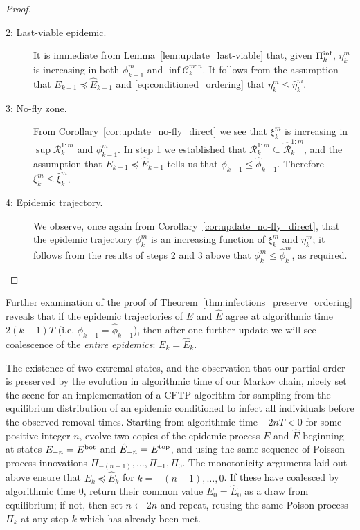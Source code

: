 \documentclass[]{article}
\newcommand{\Conditioned}{\mathcal{C}}
\newcommand{\Epidemic}{E}%
\newcommand{\Removals}{\mathcal{R}}
\newcommand{\ple}{\preceq}
\newcommand{\Poisson}{\Pi}
\newcommand{\early}[1]{#1}
\newcommand{\late}[1]{\hat{#1}}
\newcommand{\PoissonInf}{\Poisson^\textup{inf}}
\newcommand{\Bot}[1][]{{}^{\textup{bot}#1}}
\newcommand{\Top}[1][]{{}^{\textup{top}#1}}
\begin{document}
\begin{proof}
\begin{description}
	\item[2: Last-viable epidemic.] It is immediate from Lemma~\ref{lem:update_last-viable} that, given \(\PoissonInf_k\), \(\eta^m_k\) is increasing in both \(\phi^m_{k-1}\) and \(\inf\Conditioned^{m:n}_k\). It follows from the assumption that \(\early{E}_{k-1} \ple \late{E}_{k-1}\) and 	 \eqref{eq:conditioned_ordering} that \(\early{\eta}^m_k\le \late{\eta}^m_k\).
	
	\item[3: No-fly zone.] From Corollary~\ref{cor:update_no-fly_direct} we see that \(\xi^m_k\) is increasing in \(\sup \Removals^{1:m}_k\) and \(\phi^m_{k-1}\). In step 1 we established that \(\early{\Removals}^{1:m}_k\subseteq \late{\Removals}^{1:m}_k\), and the assumption that \(\early{E}_{k-1} \ple \late{E}_{k-1}\) tells us that \(\early{\phi}_{k-1} \le \late{\phi}_{k-1}\). Therefore \(\early{\xi}^m_k\le \late{\xi}^m_k\).
	
	\item[4: Epidemic trajectory.] We observe, once again from Corollary~\ref{cor:update_no-fly_direct}, that the epidemic trajectory \(\phi^m_k\) is an increasing function of \(\xi^m_k\) and \(\eta^m_k\); it follows from the results of steps 2 and 3 above that \(\early{\phi}^m_k\le \late{\phi}^m_k\), as required.
\end{description}
\end{proof}

\begin{rem}
	Further examination of the proof of Theorem~\ref{thm:infections_preserve_ordering} reveals that if the epidemic trajectories of \(\early{\Epidemic}\) and \(\late{\Epidemic}\) agree at algorithmic time \(2(k{-}1)T\) (i.e. \(\early{\phi}_{k-1} = \late{\phi}_{k-1}\)), then after one further update we will see coalescence of the \emph{entire epidemics}: \(\early{\Epidemic}_k = \late{\Epidemic}_k\). 
\end{rem}

The existence of two extremal states, and the observation that our partial order is preserved by the evolution in algorithmic time of our Markov chain, nicely set the scene for an implementation of a CFTP algorithm for sampling from the equilibrium distribution of an epidemic conditioned to infect all individuals before the observed removal times. Starting from algorithmic time \(-2nT<0\)
for some positive integer \(n\), evolve two copies of the epidemic process \(\early\Epidemic\) and \(\late\Epidemic\) beginning at states \(\early\Epidemic_{-n} = \Epidemic\Bot\) and \(\late\Epidemic_{-n} = \Epidemic\Top\), and using the same sequence of Poisson process innovations \(\Poisson_{-(n-1)},\dots,\Poisson_{-1},\Poisson_0\). The monotonicity arguments laid out above ensure that \(\early\Epidemic_k \ple \late\Epidemic_k\) for \(k=-(n-1),\dots,0\). If these have coalesced by algorithmic time 0, return their common value \(\early\Epidemic_0 = \late\Epidemic_0\) as a draw from equilibrium; if not, then set $n\leftarrow 2n$ and repeat, reusing the same Poison process \(\Poisson_k\) at any step \(k\) which has already been met. 
\end{document}
